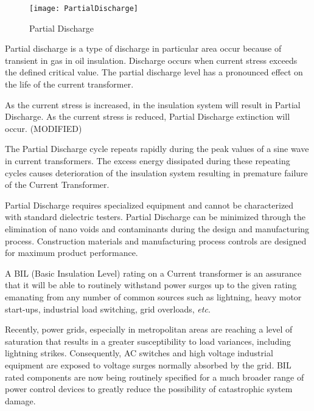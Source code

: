 \begin{figure}[h!]
    \centering
    \texttt{[image: PartialDischarge]}
    \caption{Partial Discharge}
    \label{fig:PartialDischarge}
\end{figure}

Partial discharge is a type of discharge in particular area occur because of transient in gas in oil insulation. Discharge occurs when current stress exceeds the defined critical value. The partial discharge level has a pronounced effect on the life of the current transformer\setlength{\parskip}{1em}.

As the current stress is increased, in the insulation system will result in Partial Discharge. As the current stress is reduced, Partial Discharge extinction will occur.
(MODIFIED)

The Partial Discharge cycle repeats rapidly during the peak values of a sine wave in current transformers. The excess energy dissipated during these repeating cycles causes deterioration of the insulation system resulting in premature failure of the Current Transformer.

Partial Discharge requires specialized equipment and cannot be characterized with standard dielectric testers. Partial Discharge can be minimized through the elimination of nano voids and contaminants during the design and manufacturing process. Construction materials and manufacturing process controls are designed for maximum product performance.

A BIL (Basic Insulation Level) rating on a Current transformer is an assurance that it will be able to routinely withstand power surges up to the given rating emanating from any number of common sources such as lightning, heavy motor start-ups, industrial load switching, grid overloads, \textit{etc}.

Recently, power grids, especially in metropolitan areas are reaching a level of saturation that results in a greater susceptibility to load variances, including lightning strikes. Consequently, AC switches and high voltage industrial equipment are exposed to voltage surges normally absorbed by the grid. BIL rated components are now being routinely specified for a much broader range of power control devices to greatly reduce the possibility of catastrophic system damage.

